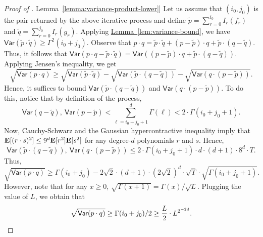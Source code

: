 \documentclass[11pt]{article}
\numberwithin{equation}{section}
\theoremstyle{definition}
\theoremstyle{plain}
\newcommand{\expref}[2]{\hyperref[#2]{#1~\ref{#2}}}
\newcommand{\E}{{\bf E}}
\begin{document}
\begin{proof}[Proof of \expref{Lemma}{lemma:variance-product-lower}]
Let us assume that $(i_0, j_0)$ is the pair returned by the above iterative process and define $\tilde{p} = \sum_{r=0}^{i_0} I_r(f_r)$ and $\tilde{q} = \sum_{r=0}^{j_0} I_r(g_r)$. Applying \expref{Lemma}{lem:variance-bound}, we have
$
\mathsf{Var}(\tilde{p} \cdot \tilde{q}) \ge {\Gamma^2(i_0+j_0)}. 
$
Observe that $p \cdot q = \tilde{p} \cdot \tilde{q} + (p - \tilde{p}) \cdot q + \tilde{p} \cdot (q-\tilde{q})$. Thus, it follows that $\mathsf{Var}(p \cdot q - \tilde{p} \cdot \tilde{q}) = \mathsf{Var}((p - \tilde{p}) \cdot q + \tilde{p} \cdot (q-\tilde{q}))$. Applying Jensen's inequality, we get
\[
\sqrt{\mathsf{Var}(p \cdot q)} \ge \sqrt{\mathsf{Var}(\tilde{p} \cdot \tilde{q})} - \sqrt{\mathsf{Var}(\tilde{p} \cdot {(q-\tilde{q})})} - \sqrt{\mathsf{Var}(q \cdot {(p-\tilde{p})})}.\]
Hence, it suffices to bound $\mathsf{Var}(\tilde{p} \cdot {(q-\tilde{q})})$ and $\mathsf{Var}(q \cdot {(p-\tilde{p})})$. To do this, notice that by definition of the process, 
\[
\mathsf{Var}(q-\tilde{q}), \ \mathsf{Var}(p-\tilde{p}) < \sum_{\ell = i_0 +j_0+1}^{d} \Gamma(\ell) <  2 \cdot \Gamma(i_0+j_0+1). 
\]
Now, Cauchy-Schwarz and the Gaussian hypercontractive inequality imply that
$\E[(r\cdot s)^2] \le 9^d \E[r^2] \E [s^2]$ for any degree-$d$ polynomials $r$ and $s$.
Hence,
\[
\mathsf{Var}(\tilde p \cdot {(q-\tilde{q})}), \  \mathsf{Var}(q \cdot {(p-\tilde{p})})\le 2 \cdot \Gamma(i_0+j_0+1) \cdot d \cdot (d+1) \cdot 8^d \cdot T. 
\]
Thus, 
\[
\sqrt{\mathsf{Var}(p \cdot q)} \ge {\Gamma(i_0+j_0)} - 2 \sqrt{2} \cdot (d+1) \cdot (2\sqrt{2})^d \cdot \sqrt{T} \cdot \sqrt{\Gamma(i_0+j_0+1)}.
\]
However, note that for any $x \ge 0$, $\sqrt{\Gamma(x+1) } = \Gamma(x) / \sqrt{L}$. Plugging the value of $L$, we obtain that 
\[
\sqrt{\mathsf{Var}(p \cdot q)}  \ge {\Gamma(i_0+j_0)}/2 \ge \frac{L}{2} \cdot L^{2^{-2d}}. \qedhere
\]
%
%
%
%
%
%
%
%
%
%
%
%
%
%
%
%
%
%
%
%
%
%
\end{proof}
\end{document}
